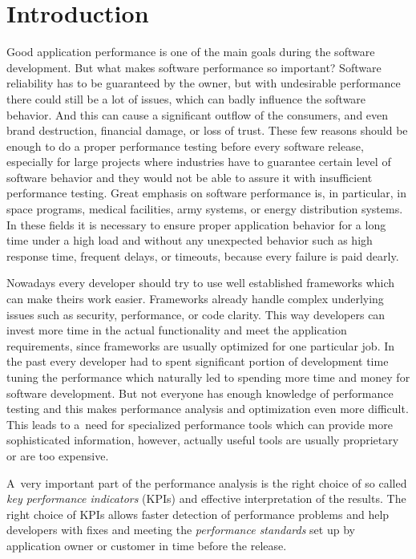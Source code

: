 


\chapter{Introduction}
\label{Introduction}
Good application performance is one of the main goals during the software development. But what makes software performance so important? Software reliability has to be guaranteed by the owner, but with undesirable performance there could still be a lot of issues, which can badly influence the software behavior. And this can cause a significant outflow of the consumers, and even brand destruction, financial damage, or loss of trust. These few reasons should be enough to do a proper performance testing before every software release, especially for large projects where industries have to guarantee certain level of software behavior and they would not be able to assure it with insufficient performance testing. Great emphasis on software performance is, in particular, in space programs, medical facilities, army systems, or energy distribution systems. In these fields it is necessary to ensure proper application behavior for a long time under a high load and without any unexpected behavior such as high response time, frequent delays, or timeouts, because every failure is paid dearly.

Nowadays every developer should try to use well established frameworks which can make theirs work easier. Frameworks already handle complex underlying issues such as security, performance, or code clarity. This way developers can invest more time in the actual functionality and meet the application requirements, since frameworks are usually optimized for one particular job. In the past every developer had to spent significant portion of development time tuning the performance which naturally led to spending more time and money for software development. But not everyone has enough knowledge of performance testing and this makes performance analysis and optimization even more difficult. This leads to a~need for specialized performance tools which can provide more sophisticated information, however, actually useful tools are usually proprietary or are too expensive.

A~very important part of the performance analysis is the right choice of so called \emph{key performance indicators} (KPIs) \cite{Molyneaux:TAoAPT} and effective interpretation of the results. The right choice of KPIs allows faster detection of performance problems and help developers with fixes and meeting the \emph{performance standards} \cite{Molyneaux:TAoAPT} set up by application owner or customer in time before the release.

